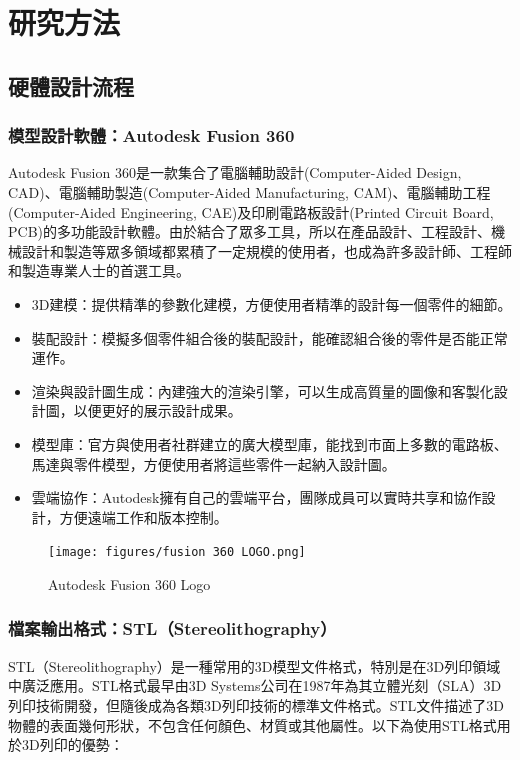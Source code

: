 \documentclass[class=NCU_thesis, crop=false]{standalone}
\begin{document}
\chapter{研究方法}
\section{硬體設計流程}
\subsection{模型設計軟體：Autodesk Fusion 360}
Autodesk Fusion 360是一款集合了電腦輔助設計(Computer-Aided Design, CAD)、電腦輔助製造(Computer-Aided Manufacturing, CAM)、電腦輔助工程(Computer-Aided Engineering, CAE)及印刷電路板設計(Printed Circuit Board, PCB)的多功能設計軟體。由於結合了眾多工具，所以在產品設計、工程設計、機械設計和製造等眾多領域都累積了一定規模的使用者，也成為許多設計師、工程師和製造專業人士的首選工具。

\begin{itemize}
	\item 3D建模：提供精準的參數化建模，方便使用者精準的設計每一個零件的細節。
	\item 裝配設計：模擬多個零件組合後的裝配設計，能確認組合後的零件是否能正常運作。
	\item 渲染與設計圖生成：內建強大的渲染引擎，可以生成高質量的圖像和客製化設計圖，以便更好的展示設計成果。
	\item 模型庫：官方與使用者社群建立的廣大模型庫，能找到市面上多數的電路板、馬達與零件模型，方便使用者將這些零件一起納入設計圖。
	\item 雲端協作：Autodesk擁有自己的雲端平台，團隊成員可以實時共享和協作設計，方便遠端工作和版本控制。
\end{itemize}

\begin{figure}[htbp]
    \centering
    \texttt{[image: figures/fusion 360 LOGO.png]}
\caption{Autodesk Fusion 360 Logo}
\end{figure}

\subsection{檔案輸出格式：STL（Stereolithography）}
STL（Stereolithography）是一種常用的3D模型文件格式，特別是在3D列印領域中廣泛應用。STL格式最早由3D Systems公司在1987年為其立體光刻（SLA）3D列印技術開發，但隨後成為各類3D列印技術的標準文件格式。STL文件描述了3D物體的表面幾何形狀，不包含任何顏色、材質或其他屬性。以下為使用STL格式用於3D列印的優勢：
\end{document}
